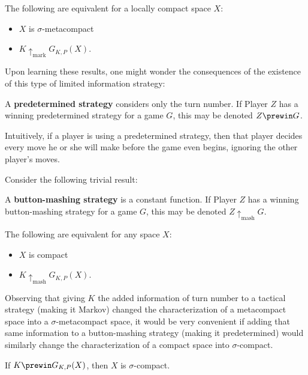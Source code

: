 \begin{thm}
The following are equivalent for a locally compact space $X$:
    \begin{itemize}
    \item $X$ is $\sigma$-metacompact
    \item $K \uparrow_{\text{mark}}G_{K,P}(X)$.
    \end{itemize}
\end{thm}

Upon learning these results, one might wonder the consequences of the existence of this type of limited information strategy:

\begin{defn}
A \textbf{predetermined strategy} considers only the turn number. If Player $Z$ has a winning predetermined strategy for a game $G$, this may be denoted $Z \prewin G$.
\end{defn}

Intuitively, if a player is using a predetermined strategy, then that player decides every move he or she will make before the game even begins, ignoring the other player's moves.

Consider the following trivial result:

\begin{defn}
A \textbf{button-mashing strategy} is a constant function. If Player $Z$ has a winning button-mashing strategy for a game $G$, this may be denoted $Z \uparrow_{\text{mash}} G$.
\end{defn}

\begin{prop}
The following are equivalent for any space $X$:
    \begin{itemize}
    \item $X$ is compact
    \item $K \uparrow_{\text{mash}}G_{K,P}(X)$.
    \end{itemize}
\end{prop}

Observing that giving $K$ the added information of turn number to a tactical strategy (making it Markov) changed the characterization of a metacompact space into a $\sigma$-metacompact space, it would be very convenient if adding that same information to a button-mashing strategy (making it predetermined) would similarly change the characterization of a compact space into $\sigma$-compact.

\begin{prop}
If $K \prewin G_{K,P}(X)$, then $X$ is $\sigma$-compact.
\end{prop}

